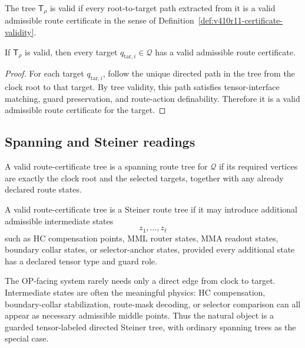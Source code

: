 \begin{definition}
\label{def:v410r12-tree-validity}
The tree \(\mathsf T_{\rho}\) is valid if every root-to-target path extracted
from it is a valid admissible route certificate in the sense of
Definition~\ref{def:v410r11-certificate-validity}.
\end{definition}

\begin{lemma}
\label{lem:v410r12-tree-validity-gives-all-certificates}
If \(\mathsf T_{\rho}\) is valid, then every target \(q_{\mathrm{tar},i}\in
\mathcal Q\) has a valid admissible route certificate.
\end{lemma}

\begin{proof}
For each target \(q_{\mathrm{tar},i}\), follow the unique directed path in the
tree from the clock root to that target. By tree validity, this path satisfies
tensor-interface matching, guard preservation, and route-action definability.
Therefore it is a valid admissible route certificate for the target.
\end{proof}

\subsection{Spanning and Steiner readings}
\label{subsec:v410r12-spanning-steiner-readings}

\begin{definition}
\label{def:v410r12-spanning-route-tree}
A valid route-certificate tree is a spanning route tree for \(\mathcal Q\) if
its required vertices are exactly the clock root and the selected targets,
together with any already declared route states.
\end{definition}

\begin{definition}
\label{def:v410r12-steiner-route-tree}
A valid route-certificate tree is a Steiner route tree if it may introduce
additional admissible intermediate states
\[
 z_1,\ldots,z_\ell
\]
such as HC compensation points, MML router states, MMA readout states, boundary
collar states, or selector-anchor states, provided every additional state has a
declared tensor type and guard role.
\end{definition}

\begin{remark}
\label{rem:v410r12-why-steiner-natural}
The OP-facing system rarely needs only a direct edge from clock to target.
Intermediate states are often the meaningful physics: HC compensation,
boundary-collar stabilization, route-mask decoding, or selector comparison can
all appear as necessary admissible middle points. Thus the natural object is a
guarded tensor-labeled directed Steiner tree, with ordinary spanning trees as
the special case.
\end{remark}

